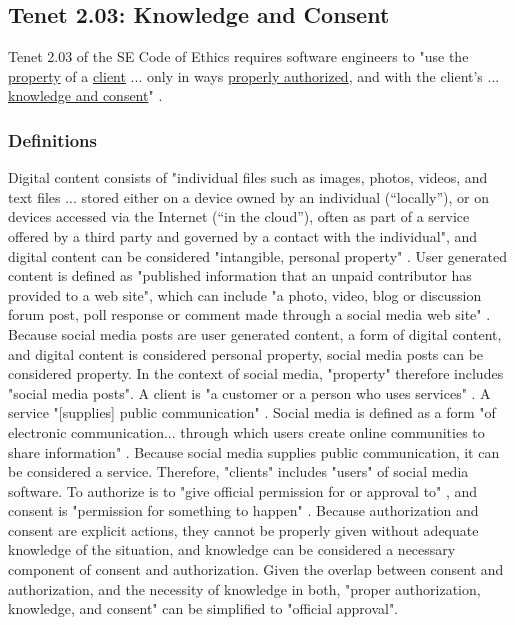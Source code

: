 \subsection{Tenet 2.03: Knowledge and Consent}
Tenet 2.03 of the SE Code of Ethics requires software engineers to "use the \uline{property} of a \uline{client} ... only in ways \uline{properly authorized}, and with the client's ... \uline{knowledge and consent}" \cite{code}.

\subsubsection{Definitions}
Digital content consists of "individual files such as images, photos, videos, and text files ... stored either on a device owned by an individual (“locally”), or on devices accessed via the Internet (“in the cloud”), often as part of a service offered by a third party and governed by a contact with the individual", and digital content can be considered "intangible, personal property" \cite{digital-assets}.  User generated content is defined as "published information that an unpaid contributor has provided to a web site", which can include "a photo, video, blog or discussion forum post, poll response or comment made through a social media web site" \cite{define-ugs}.  Because social media posts are user generated content, a form of digital content, and digital content is considered personal property, social media posts can be considered property.  In the context of social media, "property" therefore includes "social media posts".
A client is "a customer or a person who uses services" \cite{define-client}.  A service "[supplies] public communication" \cite{define-service}.  Social media is defined as a form "of electronic communication... through which users create online communities to share information" \cite{define-social-media}.  Because social media supplies public communication, it can be considered a service.  Therefore, "clients" includes "users" of social media software.
To authorize is to "give official permission for or approval to" \cite{define-authorize}, and consent is "permission for something to happen" \cite{define-consent}.  Because authorization and consent are explicit actions, they cannot be properly given without adequate knowledge of the situation, and knowledge can be considered a necessary component of consent and authorization.  Given the overlap between consent and authorization, and the necessity of knowledge in both, "proper authorization, knowledge, and consent" can be simplified to "official approval".

